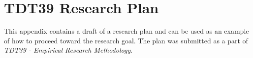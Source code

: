 \documentclass[10pt, a4paper]{report}
\begin{document}

  

  
  

  \tableofcontents \thispagestyle{empty}
  \listoffigures \thispagestyle{empty}
  
  \clearpage

  \setcounter{page}{1}

  
  

  
  
  
  
  
  
  

  

  
  
  
  \appendix

  \chapter{TDT39 Research Plan}
  This appendix contains a draft of a research plan and can be used as an example of how to proceed toward the research goal. The plan was submitted as a part of \textit{TDT39 - Empirical Research Methodology}.

  
\end{document}
